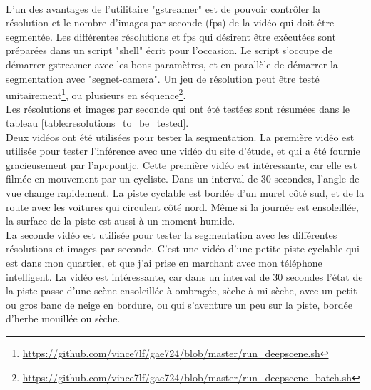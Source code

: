\vspace{\baselineskip}
\\
\noindent L'un des avantages de l'utilitaire "gstreamer" est de pouvoir contrôler la résolution et le nombre d'images par seconde (\acrshort{fps}) de la vidéo qui doit être segmentée. Les différentes résolutions et \acrshort{fps} qui désirent être exécutées sont préparées dans un script "shell" écrit pour l'occasion. Le script s'occupe de démarrer gstreamer avec les bons paramètres, et en parallèle de démarrer la segmentation avec "segnet-camera". Un jeu de résolution peut être testé unitairement\footnote{\url{https://github.com/vince7lf/gae724/blob/master/run_deepscene.sh}}, ou plusieurs en séquence\footnote{\url{https://github.com/vince7lf/gae724/blob/master/run_deepscene_batch.sh}}. 
\vspace{\baselineskip}
\\
\noindent Les résolutions et images par seconde qui ont été testées sont résumées dans le tableau \ref{table:resolutions_to_be_tested}. 
\vspace{\baselineskip}
\\
\noindent Deux vidéos ont été utilisées pour tester la segmentation. La première vidéo est utilisée pour tester l'inférence avec une vidéo du site d'étude, et qui a été fournie gracieusement par l'\acrshort{apcpontjc}. Cette première vidéo est intéressante, car elle est filmée en mouvement par un cycliste. Dans un interval de 30 secondes, l'angle de vue change rapidement. La piste cyclable est bordée d'un muret côté sud, et de la route avec les voitures qui circulent côté nord. Même si la journée est ensoleillée, la surface de la piste est aussi à un moment humide.
\vspace{\baselineskip}
\\
\noindent La seconde vidéo est utilisée pour tester la segmentation avec les différentes résolutions et images par seconde. C'est une vidéo d'une petite piste cyclable qui est dans mon quartier, et que j'ai prise en marchant avec mon téléphone intelligent. La vidéo est intéressante, car dans un interval de 30 secondes l'état de la piste passe d'une scène ensoleillée à ombragée, sèche à mi-sèche, avec un petit ou gros banc de neige en bordure, ou qui s'aventure un peu sur la piste, bordée d'herbe mouillée ou sèche.